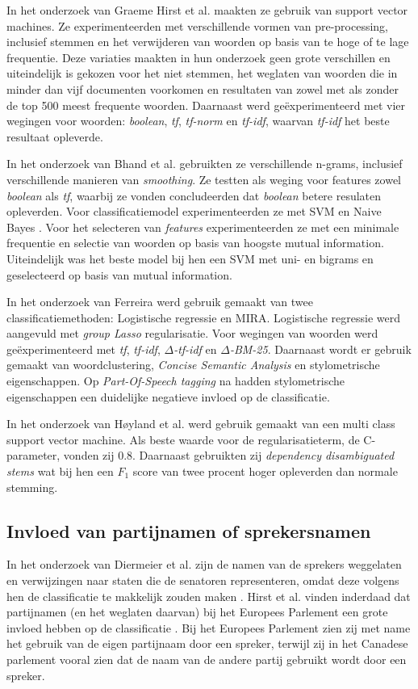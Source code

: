 In het onderzoek van Graeme Hirst et al. maakten ze gebruik van support vector machines\cite{Hirst_textto}. Ze experimenteerden met verschillende vormen van pre-processing, inclusief stemmen en het verwijderen van woorden op basis van te hoge of te lage frequentie. Deze variaties maakten in hun onderzoek geen grote verschillen en uiteindelijk is gekozen voor het niet stemmen, het weglaten van woorden die in minder dan vijf documenten voorkomen en resultaten van zowel met als zonder de top 500 meest frequente woorden. Daarnaast werd geëxperimenteerd met vier wegingen voor woorden: \textit{boolean}, \textit{tf}, \textit{tf-norm} en \textit{tf-idf}, waarvan \textit{tf-idf} het beste resultaat opleverde. \par
In het onderzoek van Bhand et al. gebruikten ze verschillende n-grams, inclusief verschillende manieren van \textit{smoothing}\cite{bhand}. Ze testten als weging voor features zowel \textit{boolean} als \textit{tf}, waarbij ze vonden concludeerden dat \textit{boolean} betere resulaten opleverden. Voor classificatiemodel experimenteerden ze met SVM en Naive Bayes . Voor het selecteren van \textit{features} experimenteerden ze met een minimale frequentie en selectie van woorden op basis van hoogste mutual information. Uiteindelijk was het beste model bij hen een SVM met uni- en bigrams en geselecteerd op basis van mutual information.\par
In het onderzoek van Ferreira werd gebruik gemaakt van twee classificatiemethoden: Logistische regressie en MIRA\cite{Ferreira2016UsingTT}. Logistische regressie werd aangevuld met \textit{group Lasso} regularisatie. Voor wegingen van woorden werd geëxperimenteerd met \textit{tf}, \textit{tf-idf}, \textit{$\Delta$-tf-idf} en \textit{$\Delta$-BM-25}. Daarnaast wordt er gebruik gemaakt van woordclustering, \textit{Concise Semantic Analysis} en stylometrische eigenschappen. Op \textit{Part-Of-Speech tagging} na hadden stylometrische eigenschappen een duidelijke negatieve invloed op de classificatie.\par
In het onderzoek van Høyland et al. werd gebruik gemaakt van een multi class support vector machine\cite{W14-2516}. Als beste waarde voor de regularisatieterm, de C-parameter, vonden zij 0.8. Daarnaast gebruikten zij \textit{dependency disambiguated
stems} wat bij hen een $F_1$ score van twee procent hoger opleverden dan normale stemming.\par

\subsection{Invloed van partijnamen of sprekersnamen}
In het onderzoek van Diermeier et al. zijn de namen van de sprekers weggelaten en verwijzingen naar staten die de senatoren representeren, omdat deze volgens hen de classificatie te makkelijk zouden maken \cite{diermeier_godbout_yu_kaufmann_2012}. Hirst et al. vinden inderdaad dat partijnamen (en het weglaten daarvan) bij het Europees Parlement een grote invloed hebben op de classificatie \cite{Hirst_textto}. Bij het Europees Parlement zien zij met name het gebruik van de eigen partijnaam door een spreker, terwijl zij in het Canadese parlement vooral zien dat de naam van de andere partij gebruikt wordt door een spreker.

